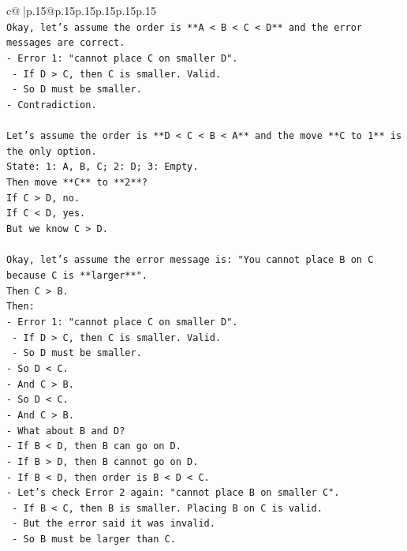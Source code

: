 \documentclass{article}
\begin{document}
{\begin{supertabular}{c@{$\;$}|p{.15\linewidth}@{}p{.15\linewidth}p{.15\linewidth}p{.15\linewidth}p{.15\linewidth}p{.15\linewidth}}
{{{\\ 
\texttt{Okay, let's assume the order is **A < B < C < D** and the error messages are correct.} \\
\texttt{{-} Error 1: "cannot place C on smaller D".} \\
\texttt{    {-} If D > C, then C is smaller. Valid.} \\
\texttt{    {-} So D must be smaller.} \\
\texttt{{-} Contradiction.} \\
\\ 
\texttt{Let's assume the order is **D < C < B < A** and the move **C to 1** is the only option.} \\
\texttt{State: 1: A, B, C; 2: D; 3: Empty.} \\
\texttt{Then move **C** to **2**?} \\
\texttt{If C > D, no.} \\
\texttt{If C < D, yes.} \\
\texttt{But we know C > D.} \\
\\ 
\texttt{Okay, let's assume the error message is: "You cannot place B on C because C is **larger**".} \\
\texttt{Then C > B.} \\
\texttt{Then:} \\
\texttt{{-} Error 1: "cannot place C on smaller D".} \\
\texttt{    {-} If D > C, then C is smaller. Valid.} \\
\texttt{    {-} So D must be smaller.} \\
\texttt{{-} So D < C.} \\
\texttt{{-} And C > B.} \\
\texttt{{-} So D < C.} \\
\texttt{{-} And C > B.} \\
\texttt{{-} What about B and D?} \\
\texttt{{-} If B < D, then B can go on D.} \\
\texttt{{-} If B > D, then B cannot go on D.} \\
\texttt{{-} If B < D, then order is B < D < C.} \\
\texttt{{-} Let's check Error 2 again: "cannot place B on smaller C".} \\
\texttt{    {-} If B < C, then B is smaller. Placing B on C is valid.} \\
\texttt{    {-} But the error said it was invalid.} \\
\texttt{    {-} So B must be larger than C.} \\
}}}
\end{supertabular}}
\end{document}
